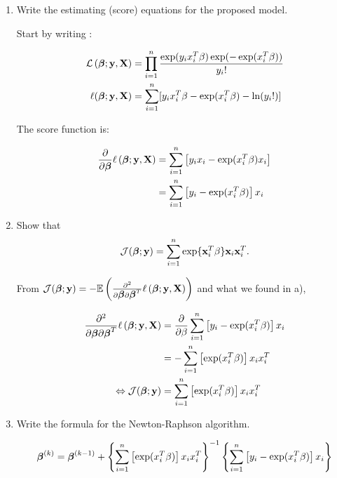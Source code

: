 \documentclass[a4paper,12pt]{article}
\def\by{\mathbf{y}}
\def\bx{\mathbf{x}}
\def\bbeta{\mbox{\boldmath $\beta$}}
\def\bX{\mathbf{X}}
\def\op{\left(}
\def\cp{\right)}
\def\oc{\left[}
\def\cc{\right]}
\def\ok{\left\{}
\def\ck{\right\}}
\begin{document}
\begin{enumerate}
  \item Write the estimating (score) equations for the proposed model.
  {\color{blue}
  
  Start by writing : 

  \begin{align*}
    \mathcal{L} \op \bbeta; \by, \bX\cp &= \prod_{i=1}^n \frac{\exp(y_ix_i^T\beta)\exp(-\exp(x_i^T\beta))}{y_i!} \\
    \ell(\bbeta; \by, \bX)&=\sum\limits_{i =1}^n [y_ix_i^T\beta - \exp(x_i^T\beta)-\ln(y_i!)]
  \end{align*}
  
  The score function is:
  
  \begin{align*}
   \frac{\partial }{\partial\bbeta}\ell \op \bbeta ; \by, \bX \cp  &= \sum_{i=1}^n \oc y_ix_i-\exp(x_i^T\beta)x_i \cc\\
   &= \sum_{i=1}^n \oc y_i-\exp(x_i^T\beta) \cc x_i 
  \end{align*}
  
  }
  \item Show that 
    \begin{equation*}
   \mathcal J(\bbeta; \by) 
   = \sum_{i=1}^n \exp\{\bx_i^T\beta\} 
   \bx_i \bx_i^T.
   \label{eq:J}
  \end{equation*}
    {\color{blue}
From $ \mathcal J(\bbeta; \by)= -\mathbb{E}\op\frac{\partial^2 }{\partial\bbeta\partial\bbeta^T}\ell \op \bbeta ; \by, \bX \cp\cp$ and what we found in a), 

\begin{align*}
    \frac{\partial^2 }{\partial\bbeta\partial\bbeta^T} \ell \op \bbeta ; \by, \bX \cp&=\frac{\partial}{\partial \beta}\sum_{i=1}^n \oc y_i-\exp(x_i^T\beta) \cc x_i \\
    &= -\sum_{i=1}^n \oc \exp(x_i^T\beta) \cc x_i x_i ^T  \\
    \Leftrightarrow \mathcal J(\bbeta; \by) &= \sum_{i=1}^n \oc \exp(x_i^T\beta) \cc x_i x_i ^T 
\end{align*}
}
  
  \item Write the formula for the Newton-Raphson algorithm.  

  {\color{blue}
\begin{align*}
    \bbeta ^ {(k)}= \bbeta^{(k-1)}+ \ok \sum_{i=1}^n \oc \exp(x_i^T\beta) \cc x_i x_i ^T\ck^{-1}\ok \sum_{i=1}^n \oc y_i-\exp(x_i^T\beta) \cc x_i \ck
\end{align*}
}
\end{enumerate}
\end{document}
